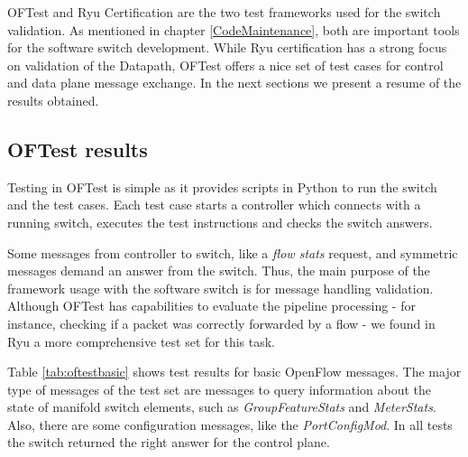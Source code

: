 OFTest and Ryu Certification are the two test frameworks used for the switch validation. As mentioned in chapter \ref{CodeMaintenance}, both are important tools for the software switch development. While Ryu certification has a strong focus on validation of the Datapath, OFTest offers a nice set of test cases for control and data plane message exchange. In the next sections we present a resume of the results obtained.  


\subsection{OFTest results}

Testing in OFTest is simple as it provides scripts in Python to run the switch and the test cases. Each test case starts a controller which connects with a running switch, executes the test instructions and checks the switch answers. 

Some messages from controller to switch, like a \textit{flow stats} request, and symmetric messages demand an answer from the switch. Thus, the main purpose of the framework usage with the software switch is for message handling validation. Although OFTest has capabilities to evaluate the pipeline processing - for instance, checking if a packet was correctly forwarded by a flow - we found in Ryu a more comprehensive test set for this task. 

Table \ref{tab:oftestbasic} shows test results for basic OpenFlow messages. The major type of messages of the test set are messages to query information about the state of manifold switch elements, such as \textit{GroupFeatureStats} and \textit{MeterStats}. Also, there are some configuration messages, like the \textit{PortConfigMod}. In all tests the switch returned the right answer for the control plane.


